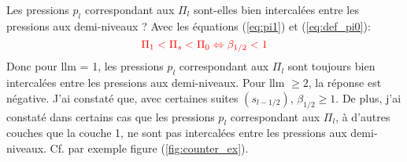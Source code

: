 \documentclass[a4paper,french]{article}
\begin{document}
Les pressions $p_l$ correspondant aux $\Pi_l$ sont-elles bien
intercalées entre les pressions aux demi-niveaux ? Avec les équations
(\ref{eq:pi1}) et (\ref{eq:def_pi0}):
\begin{displaymath}
  {\color{red}
    \Pi_1 < \Pi_s < \Pi_0 \Leftrightarrow \beta_{1/2} < 1
  }
\end{displaymath}
Donc pour llm = 1, les pressions $p_l$ correspondant aux $\Pi_l$ sont
toujours bien intercalées entre les pressions aux demi-niveaux. Pour
llm $\ge 2$, la réponse est négative. J'ai constaté que, avec
certaines suites $(s_{l-1/2})$, $\beta_{1/2} \ge 1$. De plus, j'ai
constaté dans certains cas que les pressions $p_l$ correspondant aux
$\Pi_l$, à d'autres couches que la couche 1, ne sont pas intercalées
entre les pressions aux demi-niveaux. Cf. par exemple figure
(\ref{fig:counter_ex}).
\end{document}
